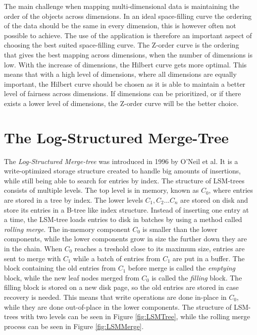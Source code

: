 \noindent
The main challenge when mapping multi-dimensional data is maintaining the order of the objects across dimensions. In an ideal space-filling curve the ordering of the data should be the same in every dimension, this is however often not possible to achieve. The use of the application is therefore an important aspect of choosing the best suited space-filling curve. The Z-order curve is the ordering that gives the best mapping across dimensions, when the number of dimensions is low. With the increase of dimensions, the Hilbert curve gets more optimal\cite{IrregularSpace}. This means that with a high level of dimensions, where all dimensions are equally important, the Hilbert curve should be chosen as it is able to maintain a better level of fairness across dimensions. If dimensions can be prioritized, or if there exists a lower level of dimensions, the Z-order curve will be the better choice.

\section{The Log-Structured Merge-Tree}
The \emph{Log-Structured Merge-tree} was introduced in 1996 by O'Neil et al\cite{LSMTree}. It is a write-optimized storage structure created to handle big amounts of insertions, while still being able to search for entries by index. The structure of LSM-trees consists of multiple levels. The top level is in memory, known as $C_0$, where entries are stored in a tree by index. The lower levels $C_1, C_2 ... C_n$ are stored on disk and store its entries in a B-tree like index structure. Instead of inserting one entry at a time, the LSM-tree loads entries to disk in batches by using a method called \emph{rolling merge}. The in-memory component $C_0$ is smaller than the lower components, while the lower components grow in size the further down they are in the chain. When $C_0$ reaches a treshold close to its maximum size, entries are sent to merge with $C_1$ while a batch of entries from $C_1$ are put in a buffer. The block containing the old entries from $C_1$ before merge is called the \emph{emptying} block, while the new leaf nodes merged from $C_0$ is called the \emph{filling} block. The filling block is stored on a new disk page, so the old entries are stored in case recovery is needed. This means that write operations are done in-place in $C_0$, while they are done out-of-place in the lower components. The structure of LSM-trees with two levels can be seen in Figure \ref{fig:LSMTree}, while the rolling merge process can be seen in Figure \ref{fig:LSMMerge}. 

